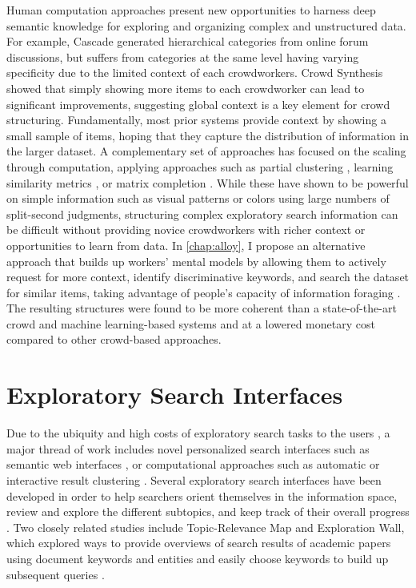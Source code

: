 Human computation approaches present new opportunities to harness deep semantic knowledge for exploring and organizing complex and unstructured data. For example, Cascade \cite{chilton2013cascade,bragg2013crowdsourcing} generated hierarchical categories from online forum discussions, but suffers from categories at the same level having varying specificity due to the limited context of each crowdworkers. Crowd Synthesis \cite{andre2014crowd} showed that simply showing more items to each crowdworker can lead to significant improvements, suggesting global context is a key element for crowd structuring. Fundamentally, most prior systems provide context by showing a small sample of items, hoping that they capture the distribution of information in the larger dataset. A complementary set of approaches has focused on the scaling through computation, applying approaches such as partial clustering \cite{yi2012crowdclustering}, learning similarity metrics \cite{tamuz2011adaptively}, or matrix completion \cite{yi2012semi}. While these have shown to be powerful on simple information such as visual patterns or colors using large numbers of split-second judgments, structuring complex exploratory search information can be difficult without providing novice crowdworkers with richer context or opportunities to learn from data. In \cref{chap:alloy}, I propose an alternative approach that builds up workers' mental models by allowing them to actively request for more context, identify discriminative keywords, and search the dataset for similar items, taking advantage of people's capacity of information foraging \cite{pirolli1999information}. The resulting structures were found to be more coherent than a state-of-the-art crowd and machine learning-based systems and at a lowered monetary cost compared to other crowd-based approaches. 


\section{Exploratory Search Interfaces}

Due to the ubiquity and high costs of exploratory search tasks to the users \cite{marchionini2006exploratory}, a major thread of work includes novel personalized search interfaces such as semantic web interfaces \cite{wilson2006mspace}, or computational approaches such as automatic or interactive result clustering \cite{cutting2017scatter}. Several exploratory search interfaces have been developed in order to help searchers orient themselves in the information space, review and explore the different subtopics, and keep track of their overall progress \cite{hearst2009search,marchionini2000agileviews,patterson2001predicting,tretter2013searchpanel,morris2008searchbar}. Two closely related studies include Topic-Relevance Map and Exploration Wall, which explored ways to provide overviews of search results of academic papers using document keywords and entities and easily choose keywords to build up subsequent queries \cite{peltonen2017topic,klouche2015designing}. 


